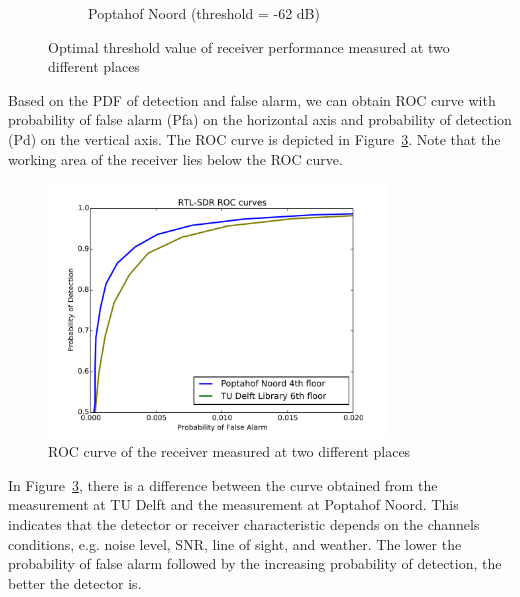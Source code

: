 \begin{figure}[H]
\begin{subfigure}[b]{0.45\textwidth}
        \caption{Poptahof Noord (threshold = -62 dB)}
        \label{fig:popta-pdf-optim}
    \end{subfigure}
    \caption{Optimal threshold value of receiver performance measured at two different places}\label{fig:all-pdf-optimized}
\end{figure}

Based on the PDF of detection and false alarm, we can obtain ROC curve with probability of false alarm (Pfa) on the horizontal axis and probability of detection (Pd) on the vertical axis. The ROC curve is depicted in Figure~\ref{fig:roc-combine}. Note that the working area of the receiver lies below the ROC curve.

\begin{figure}[H]
    \centering
    \includegraphics[width=0.8\textwidth]{figures/lib-roc-combine}
    \caption{ROC curve of the receiver measured at two different places}\label{fig:roc-combine}
\end{figure}

In Figure~\ref{fig:roc-combine}, there is a difference between the curve obtained from the measurement at TU Delft and the measurement at Poptahof Noord. This indicates that the detector or receiver characteristic depends on the channels conditions, e.g. noise level, SNR, line of sight, and weather. The lower the probability of false alarm followed by the increasing probability of detection, the better the detector is.